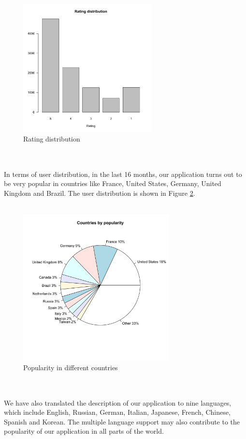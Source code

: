 \\
\begin{figure}[htb]
\centering \includegraphics[height=7cm]{charts/rating_distribution}
\caption{Rating distribution\label{ratings}}
\end{figure}\\
\\
In terms of user distribution, in the last 16 months, our application turns out
to be very popular in countries like France, United States, Germany, United Kingdom
and Brazil. The user distribution is shown in Figure \ref{user_country}.\\
\\
\begin{figure}[htb]
\centering \includegraphics[height=8cm]{charts/country_popularity}
\caption{Popularity in different countries \label{user_country}}
\end{figure}\\
\\
We have also translated the description of our application to nine languages, which include English, Russian, German, Italian, Japanese, French, Chinese, Spanish and Korean. The multiple language support may also contribute to the popularity of our application in all parts of the world.\\
